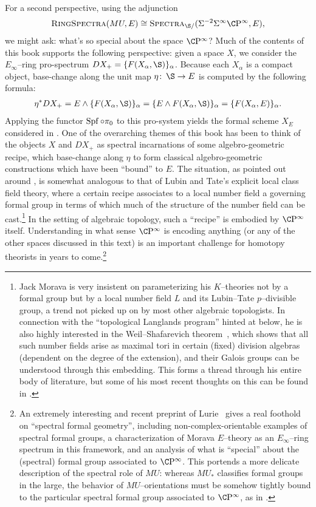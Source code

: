 For a second perspective, using the adjunction \[\CatOf{RingSpectra}(MU, E) \cong \CatOf{Spectra}_{\S/}(\Susp^{-2} \Susp^\infty \CP^\infty, E),\] we might ask: what's so special about the space \(\CP^\infty\)?  Much of the contents of this book supports the following perspective: given a space \(X\), we consider the \(E_\infty\)--ring pro-spectrum \(DX_+ = \{F(X_\alpha, \S)\}_\alpha\).  Because each \(X_\alpha\) is a compact object, base-change along the unit map \(\eta\co \S \to E\) is computed by the following formula:
\begin{align*}
\eta^* DX_+ = E \sm \{F(X_\alpha, \S)\}_\alpha = \{E \sm F(X_\alpha, \S)\}_\alpha = \{F(X_\alpha, E)\}_\alpha.
\end{align*}
Applying the functor \(\operatorname{Spf} \circ \pi_0\) to this pro-system yields the formal scheme \(X_E\) considered in .  One of the overarching themes of this book has been to think of the objects \(X\) and \(DX_+\) as spectral incarnations of some algebro-geometric recipe, which base-change along \(\eta\) to form classical algebro-geometric constructions which have been ``bound'' to \(E\).  The situation, as pointed out around , is somewhat analogous to that of Lubin and Tate's explicit local class field theory, where a certain recipe associates to a local number field a governing formal group in terms of which much of the structure of the number field can be cast.\footnote{Jack Morava is very insistent on parameterizing his \(K\)--theories not by a formal group but by a local number field \(L\) and its Lubin--Tate \(p\)--divisible group, a trend not picked up on by most other algebraic topologists.  In connection with the ``topological Langlands program'' hinted at below, he is also highly interested in the Weil--Shafarevich theorem~\cite[Appendix III]{Weil}, which shows that all such number fields arise as maximal tori in certain (fixed) division algebras (dependent on the degree of the extension), and their Galois groups can be understood through this embedding.  This forms a thread through his entire body of literature, but some of his most recent thoughts on this can be found in \cite{MoravaTHH}.}  In the setting of algebraic topology, such a ``recipe'' is embodied by \(\CP^\infty\) itself.  Understanding in what sense \(\CP^\infty\) is encoding anything (or any of the other spaces discussed in this text) is an important challenge for homotopy theorists in years to come.\footnote{An extremely interesting and recent preprint of Lurie~\cite{LurieEllII} gives a real foothold on ``spectral formal geometry'', including non-complex-orientable examples of spectral formal groups, a characterization of Morava \(E\)--theory as an \(E_\infty\)--ring spectrum in this framework, and an analysis of what is ``special'' about the (spectral) formal group associated to \(\CP^\infty\).  This portends a more delicate description of the spectral role of \(MU\): whereas \(MU_*\) classifies formal groups in the large, the behavior of \(MU\)--orientations must be somehow tightly bound to the particular spectral formal group associated to \(\CP^\infty\), as in .}

